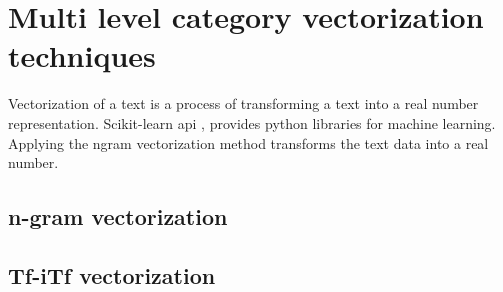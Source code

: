 
\chapter{Multi level category vectorization techniques}

Vectorization of a text is a process of transforming a text into a real number representation. Scikit-learn api \parencite{sklearn_api}, provides python libraries for machine learning. Applying the ngram vectorization method transforms the text data into a real number. 

\section {n-gram vectorization}

\section {Tf-iTf vectorization}